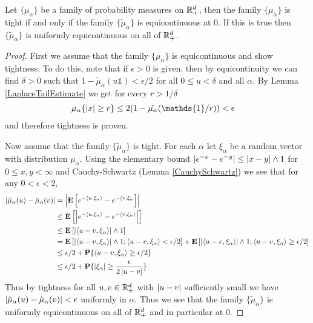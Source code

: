 \begin{lem}\label{LaplaceEquicontinuityAndTightness}Let $\lbrace
  \mu_\alpha \rbrace$
  be a family of probability measures on $\mathbb{R}^d_+$, then the family
  $\lbrace \mu_\alpha \rbrace$ is tight if and only if the family
  $\lbrace \tilde{\mu}_\alpha \rbrace$ is equicontinuous at $0$.  If
  this is true then $\lbrace \tilde{\mu}_\alpha \rbrace$ is uniformly equicontinuous on all of $\mathbb{R}^d_+$.
\end{lem}
\begin{proof}
First we assume that the family $\lbrace \mu_\alpha \rbrace$ is
equicontinuous and show tightness.  To do this, note that if $\epsilon
> 0$ is given,
 then by equicontinuity we can find
$\delta>0$ such that $1 - \tilde{\mu}_\alpha(u \mathds{1}) < \epsilon/2$ for all
$0 \leq u < \delta$ and all $\alpha$.  By Lemma
\ref{LaplaceTailEstimate} we get for every $r > 1/\delta$ 
\begin{align*}
\mu_\alpha\lbrace \abs{x} \geq r \rbrace &\leq 2 (1 - \tilde{\mu_\alpha}(\mathds{1}/r)) < \epsilon
\end{align*}
and therefore tightness is proven. 

Now assume that the family $\lbrace \tilde{\mu}_\alpha \rbrace$ is
tight.  For each $\alpha$ let $\xi_\alpha$ be a random vector with
distribution $\mu_\alpha$.  Using the elementary bound $\left \vert e^{-x} - e^{-y} \right \vert \leq \left \vert x
  -y \right \vert \wedge 1$ for $0 \leq x,y < \infty$ and Cauchy-Schwartz (Lemma
\ref{CauchySchwartz}) we see that for any
$0 < \epsilon < 2$,
\begin{align*}
\left \vert \tilde{\mu}_\alpha(u) - \tilde{\mu}_\alpha(v) \right \vert &=
\left \vert \textbf{E}\left[ e^{-\langle u, \xi_\alpha \rangle} - e^{-\langle v,
      \xi_\alpha}\right] \right \vert \\ 
&\leq
\textbf{E}\left[\left \vert  e^{-\langle u, \xi_\alpha \rangle} - e^{-\langle v,
      \xi_\alpha \rangle} \right \vert\right] \\ 
&\leq \textbf{E}\left[\left \vert \langle u-v, \xi_\alpha \rangle \right \vert \wedge 1\right] \\ 
&= \textbf{E}\left[\left \vert \langle u-v, \xi_\alpha \rangle \right \vert \wedge 1 ;
  \langle u-v, \xi_\alpha \rangle < \epsilon/2\right]  + 
\textbf{E}\left[\left \vert \langle u-v, \xi_\alpha \rangle \right \vert \wedge 1 ;
  \langle u-v, \xi_\alpha \rangle \geq \epsilon/2\right] \\ 
&\leq \epsilon/2 + 
\textbf{P}\{\langle u-v, \xi_\alpha \rangle \geq \epsilon/2\} \\ 
&\leq \epsilon/2 + 
\textbf{P}\{\left \vert \xi_\alpha  \right \vert \geq \frac{\epsilon}{2\left \vert u-v \right \vert}\} \\ 
\end{align*}
Thus by tightness for all $u,v \in \mathbb{R}^d_+$ with $\left \vert u-v \right \vert$
sufficiently small we have $\left \vert \tilde{\mu}_\alpha(u) -
  \tilde{\mu}_\alpha(v) \right \vert < \epsilon$ uniformly in $\alpha$.  Thus we see that
the family
$\lbrace \tilde{\mu}_\alpha \rbrace$ is uniformly equicontinuous on
all of $\mathbb{R}^d_+$ and in particular at $0$.
\end{proof}

